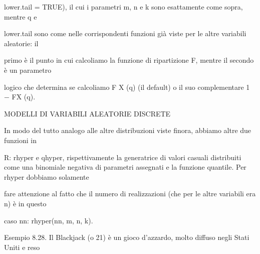 \documentclass[a4paper,portrait,12pt]{article}
\begin{document}
\begin{flushleft}
lower.tail = TRUE), il cui i parametri m, n e k sono esattamente come sopra, mentre q e
\end{flushleft}


\begin{flushleft}
lower.tail sono come nelle corrispondenti funzioni gi\`{a} viste per le altre variabili aleatorie: il
\end{flushleft}


\begin{flushleft}
primo \`{e} il punto in cui calcoliamo la funzione di ripartizione F, mentre il secondo \`{e} un parametro
\end{flushleft}


\begin{flushleft}
logico che determina se calcoliamo F X (q) (il default) o il suo complementare 1 $-$ FX (q).
\end{flushleft}










\begin{flushleft}
MODELLI DI VARIABILI ALEATORIE DISCRETE
\end{flushleft}





\begin{flushleft}
In modo del tutto analogo alle altre distribuzioni viste finora, abbiamo altre due funzioni in
\end{flushleft}


\begin{flushleft}
R: rhyper e qhyper, rispettivamente la generatrice di valori casuali distribuiti come una binomiale negativa di parametri assegnati e la funzione quantile. Per rhyper dobbiamo solamente
\end{flushleft}


\begin{flushleft}
fare attenzione al fatto che il numero di realizzazioni (che per le altre variabili era n) \`{e} in questo
\end{flushleft}


\begin{flushleft}
caso nn: rhyper(nn, m, n, k).
\end{flushleft}


\begin{flushleft}
Esempio 8.28. Il Blackjack (o 21) \`{e} un gioco d'azzardo, molto diffuso negli Stati Uniti e reso
\end{flushleft}
\end{document}
